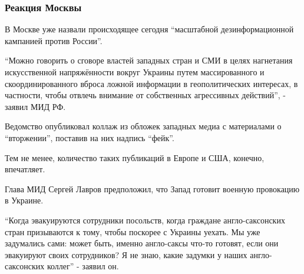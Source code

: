  
 
 
 
 

\subsubsection{Реакция Москвы}

В Москве уже назвали происходящее сегодня \enquote{масштабной дезинформационной
кампанией против России}.  

\enquote{Можно говорить о сговоре властей западных стран и СМИ в целях нагнетания
искусственной напряжённости вокруг Украины путем массированного и
скоординированного вброса ложной информации в геополитических интересах, в
частности, чтобы отвлечь внимание от собственных агрессивных действий}, -
заявил МИД РФ.

Ведомство опубликовал коллаж из обложек западных медиа с материалами о
\enquote{вторжении}, поставив на них надпись \enquote{фейк}. 

Тем не менее, количество таких публикаций в Европе и США, конечно, впечатляет.


Глава МИД Сергей Лавров предположил, что Запад готовит военную провокацию в
Украине.

\enquote{Когда эвакуируются сотрудники посольств, когда граждане
англо-саксонских стран призываются к тому, чтобы поскорее с Украины уехать. Мы
уже задумались сами: может быть, именно англо-саксы что-то готовят, если они
эвакуируют своих сотрудников? Я не знаю, какие задумки у наших англо-саксонских
коллег} - заявил он.

